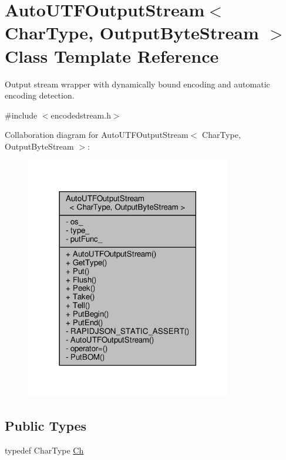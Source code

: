 \hypertarget{classAutoUTFOutputStream}{}\section{Auto\+U\+T\+F\+Output\+Stream$<$ Char\+Type, Output\+Byte\+Stream $>$ Class Template Reference}
\label{classAutoUTFOutputStream}


Output stream wrapper with dynamically bound encoding and automatic encoding detection.  




{\ttfamily \#include $<$encodedstream.\+h$>$}



Collaboration diagram for Auto\+U\+T\+F\+Output\+Stream$<$ Char\+Type, Output\+Byte\+Stream $>$\+:
\nopagebreak
\begin{figure}[H]
\begin{center}
\leavevmode
\includegraphics[width=254pt]{classAutoUTFOutputStream__coll__graph}
\end{center}
\end{figure}
\subsection*{Public Types}
\begin{DoxyCompactItemize}
\item 
typedef Char\+Type \hyperlink{classAutoUTFOutputStream_abd8c486101026e11828e86c18991c9c0}{Ch}
\end{DoxyCompactItemize}
